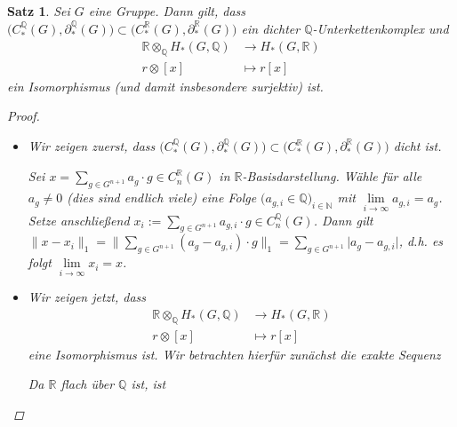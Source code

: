 \documentclass[a4paper,twoside,10pt]{scrreprt}
\DeclareMathOperator{\img}{im}
\newcommand{\N}{\mathbb{N}}
\newcommand{\Q}{\mathbb{Q}}
\newcommand{\R}{\mathbb{R}}
\newtheorem{satz}{Satz}[section]
\theoremstyle{definition}
\begin{document}
\begin{satz}\label{satz:QFulfillsConditions}
Sei $G$ eine Gruppe.
Dann gilt, dass $\bigl(C_*^{\Q}(G),\partial_*^{\Q}(G)\bigr)\subset (C_*^{\R}(G),\partial_*^{\R}(G)\bigr)$ ein dichter $\Q$-Unterkettenkomplex und
\begin{align*}
\R\otimes_{\Q}H_*(G,\Q)&\to H_*(G,\R)\\
r\otimes [x] &\mapsto r[x]
\end{align*}
ein Isomorphismus (und damit insbesondere surjektiv) ist.
\begin{proof}\hfill
\begin{itemize}
\item Wir zeigen zuerst, dass $\bigl(C_*^{\Q}(G),\partial_*^{\Q}(G)\bigr)\subset (C_*^{\R}(G),\partial_*^{\R}(G)\bigr)$ dicht ist.\par
Sei $x=\sum\limits_{g\in G^{n+1}} a_g\cdot g\in C_n^{\R}(G)$ in $\R$-Basisdarstellung. Wähle für alle $a_g\neq 0$ (dies sind endlich viele) eine Folge $\bigl(a_{g,i}\in \Q\bigr)_{i\in\N}$ mit $\lim\limits_{i\to \infty}a_{g,i}=a_g$. Setze anschließend $x_i:=\sum\limits_{g\in G^{n+1}}a_{g,i}\cdot g\in C_n^{\Q}(G)$. Dann gilt $\|x-x_i\|_1=\biggl\|\sum\limits_{g\in G^{n+1}}(a_g-a_{g,i})\cdot g\biggr\|_1=\sum\limits_{g\in G^{n+1}}\lvert a_g-a_{g,i}\rvert$, d.h. es folgt $\lim\limits_{i\to\infty}x_i=x$.
\item Wir zeigen jetzt, dass 
\begin{align*}
\R\otimes_{\Q}H_*(G,\Q)&\to H_*(G,\R)\\
r\otimes [x] &\mapsto r[x]
\end{align*} 
eine Isomorphismus ist. Wir betrachten hierfür zunächst die exakte Sequenz
\begin{center}
\end{center}
Da $\R$ flach über $\Q$ ist, ist 
\begin{center}
\end{center}
\end{itemize}
\end{proof}
\end{satz}
\end{document}
